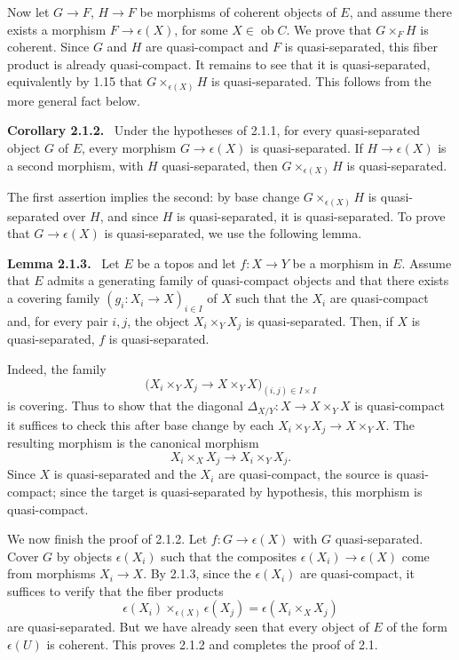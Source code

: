 \documentclass[11pt]{article}
\newcommand{\ob}{\operatorname{ob}}
\newenvironment{statement}[1]{\par\medskip\noindent\textbf{#1.}\ }{\par\medskip}
\begin{document}
Now let \(G\to F\), \(H\to F\) be morphisms of coherent objects of \(E\), and assume there exists a morphism \(F\to\epsilon(X)\), for some \(X\in\ob C\). We prove that \(G\times_FH\) is coherent. Since \(G\) and \(H\) are quasi-compact and \(F\) is quasi-separated, this fiber product is already quasi-compact. It remains to see that it is quasi-separated, equivalently by 1.15 that \(G\times_{\epsilon(X)}H\) is quasi-separated. This follows from the more general fact below.

\begin{statement}{Corollary 2.1.2}
Under the hypotheses of 2.1.1, for every quasi-separated object \(G\) of \(E\), every morphism \(G\to\epsilon(X)\) is quasi-separated. If \(H\to\epsilon(X)\) is a second morphism, with \(H\) quasi-separated, then \(G\times_{\epsilon(X)}H\) is quasi-separated.
\end{statement}

The first assertion implies the second: by base change \(G\times_{\epsilon(X)}H\) is quasi-separated over \(H\), and since \(H\) is quasi-separated, it is quasi-separated. To prove that \(G\to\epsilon(X)\) is quasi-separated, we use the following lemma.

\begin{statement}{Lemma 2.1.3}
Let \(E\) be a topos and let \(f:X\to Y\) be a morphism in \(E\). Assume that \(E\) admits a generating family of quasi-compact objects and that there exists a covering family \((g_i:X_i\to X)_{i\in I}\) of \(X\) such that the \(X_i\) are quasi-compact and, for every pair \(i,j\), the object \(X_i\times_YX_j\) is quasi-separated. Then, if \(X\) is quasi-separated, \(f\) is quasi-separated.
\end{statement}

Indeed, the family
\[
\bigl(X_i\times_YX_j\to X\times_YX\bigr)_{(i,j)\in I\times I}
\]
is covering. Thus to show that the diagonal \(\Delta_{X/Y}:X\to X\times_YX\) is quasi-compact it suffices to check this after base change by each \(X_i\times_YX_j\to X\times_YX\). The resulting morphism is the canonical morphism
\[
X_i\times_X X_j\longrightarrow X_i\times_YX_j.
\]
Since \(X\) is quasi-separated and the \(X_i\) are quasi-compact, the source is quasi-compact; since the target is quasi-separated by hypothesis, this morphism is quasi-compact.

We now finish the proof of 2.1.2. Let \(f:G\to\epsilon(X)\) with \(G\) quasi-separated. Cover \(G\) by objects \(\epsilon(X_i)\) such that the composites \(\epsilon(X_i)\to\epsilon(X)\) come from morphisms \(X_i\to X\). By 2.1.3, since the \(\epsilon(X_i)\) are quasi-compact, it suffices to verify that the fiber products
\[
\epsilon(X_i)\times_{\epsilon(X)}\epsilon(X_j)=\epsilon(X_i\times_X X_j)
\]
are quasi-separated. But we have already seen that every object of \(E\) of the form \(\epsilon(U)\) is coherent. This proves 2.1.2 and completes the proof of 2.1.
\end{document}
